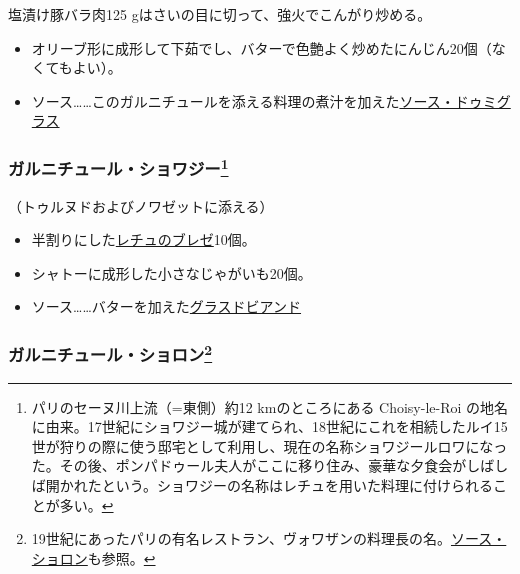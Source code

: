 \begin{recette}
塩漬け豚バラ肉125 gはさいの目に切って、強火でこんがり炒める。

\begin{itemize}
\item
  オリーブ形に成形して下茹でし、バターで色艶よく炒めたにんじん20個（なくてもよい）。
\item
  ソース\ldots{}\ldots{}このガルニチュールを添える料理の煮汁を加えた\protect\hyperlink{sauce-demi-glace}{ソース・ドゥミグラス}
\end{itemize}

\hypertarget{garniture-choisy}{%
\subsubsection[ガルニチュール・ショワジー]{\texorpdfstring{ガルニチュール・ショワジー\footnote{パリのセーヌ川上流（=東側）約12
  kmのところにある Choisy-le-Roi
  の地名に由来。17世紀にショワジー城が建てられ、18世紀にこれを相続したルイ15世が狩りの際に使う邸宅として利用し、現在の名称ショワジールロワになった。その後、ポンパドゥール夫人がここに移り住み、豪華な夕食会がしばしば開かれたという。ショワジーの名称はレチュを用いた料理に付けられることが多い。}}{ガルニチュール・ショワジー}}\label{garniture-choisy}}



（トゥルヌドおよびノワゼットに添える）

\begin{itemize}
\item
  半割りにした\protect\hyperlink{laitue-braise}{レチュのブレゼ}10個。
\item
  シャトーに成形した小さなじゃがいも20個。
\item
  ソース\ldots{}\ldots{}バターを加えた\protect\hyperlink{glace-de-viande}{グラスドビアンド}
\end{itemize}

\hypertarget{garniture-choron}{%
\subsubsection[ガルニチュール・ショロン]{\texorpdfstring{ガルニチュール・ショロン\footnote{19世紀にあったパリの有名レストラン、ヴォワザンの料理長の名。\protect\hyperlink{sauce-bearnaise-tomatee}{ソース・ショロン}も参照。}}{ガルニチュール・ショロン}}\label{garniture-choron}}


\end{recette}
